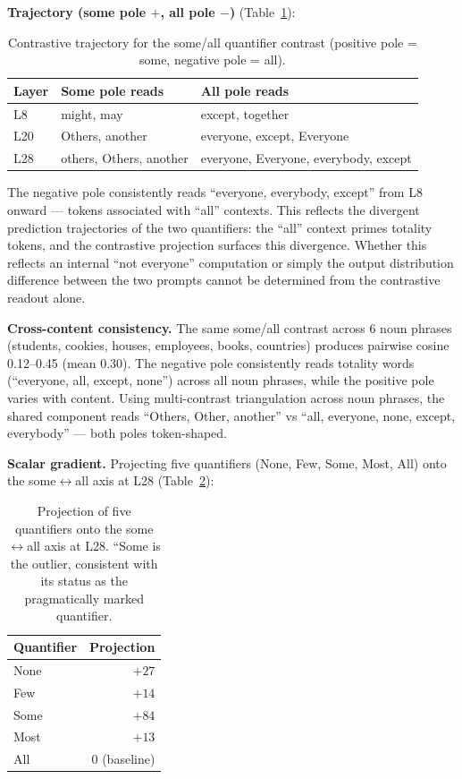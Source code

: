 \documentclass[11pt]{article}
\begin{document}
\textbf{Trajectory (some pole $+$, all pole $-$)} (Table~\ref{tab:somall-traj}):

\begin{table}[htbp]
\centering
\small
\begin{tabular}{lll}
\toprule
Layer & Some pole reads & All pole reads \\
\midrule
L8 & might, may & except, together \\
L20 & Others, another & everyone, except, Everyone \\
L28 & others, Others, another & everyone, Everyone, everybody, except \\
\bottomrule
\end{tabular}
\caption{Contrastive trajectory for the some/all quantifier contrast (positive pole = some, negative pole = all).}
\label{tab:somall-traj}
\end{table}

The negative pole consistently reads ``everyone, everybody, except'' from L8
onward --- tokens associated with ``all'' contexts. This reflects the divergent
prediction trajectories of the two quantifiers: the ``all'' context primes
totality tokens, and the contrastive projection surfaces this divergence.
Whether this reflects an internal ``not everyone'' computation or simply the
output distribution difference between the two prompts cannot be determined
from the contrastive readout alone.

\textbf{Cross-content consistency.} The same some/all contrast across 6 noun
phrases (students, cookies, houses, employees, books, countries) produces
pairwise cosine 0.12--0.45 (mean 0.30). The negative pole consistently reads
totality words (``everyone, all, except, none'') across all noun phrases,
while the positive pole varies with content. Using multi-contrast
triangulation across noun phrases, the shared component reads ``Others,
Other, another'' vs ``all, everyone, none, except, everybody'' --- both poles
token-shaped.

\textbf{Scalar gradient.} Projecting five quantifiers (None, Few, Some, Most,
All) onto the some$\leftrightarrow$all axis at L28 (Table~\ref{tab:scalar-gradient}):

\begin{table}[htbp]
\centering
\small
\begin{tabular}{lr}
\toprule
Quantifier & Projection \\
\midrule
None & $+27$ \\
Few & $+14$ \\
Some & $+84$ \\
Most & $+13$ \\
All & 0 (baseline) \\
\bottomrule
\end{tabular}
\caption{Projection of five quantifiers onto the some$\leftrightarrow$all axis at L28. ``Some is the outlier, consistent with its status as the pragmatically marked quantifier.}
\label{tab:scalar-gradient}
\end{table}
\end{document}
